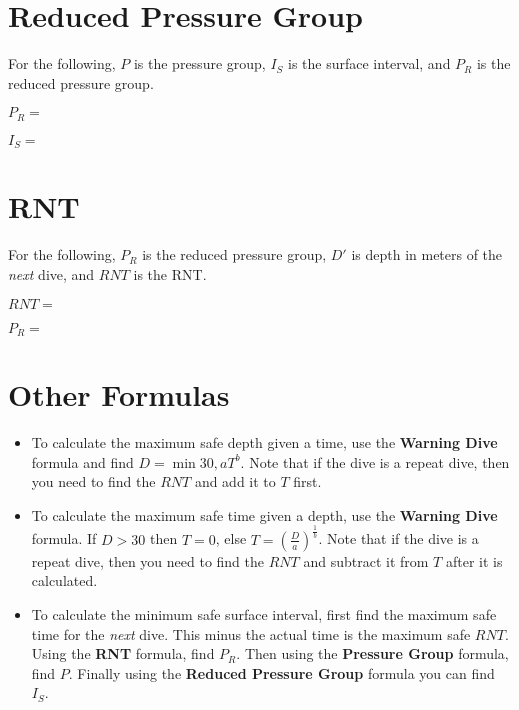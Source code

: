 \documentclass[17pt]{article}
\begin{document}
\newpage

\section{Reduced Pressure Group}

For the following, $P$ is the pressure group, $I_S$ is the surface interval, and $P_R$ is the reduced pressure group.

$P_R = $

$I_S = $

\newpage

\section{RNT}

For the following, $P_R$ is the reduced pressure group, $D'$ is depth in meters of the \emph{next} dive, and $RNT$ is the RNT.

$RNT = $

$P_R = $

\newpage

\section{Other Formulas}

\begin{itemize}
	\item To calculate the maximum safe depth given a time, use the \textbf{Warning Dive} formula and find $D = \min 30, aT^b$. Note that if the dive is a repeat dive, then you need to find the $RNT$ and add it to $T$ first.
	\item To calculate the maximum safe time given a depth, use the \textbf{Warning Dive} formula. If $D > 30$ then $T = 0$, else $T = \left(\frac{D}{a}\right)^{\frac{1}{b}}$. Note that if the dive is a repeat dive, then you need to find the $RNT$ and subtract it from $T$ after it is calculated.
	\item To calculate the minimum safe surface interval, first find the maximum safe time for the \emph{next} dive. This minus the actual time is the maximum safe $RNT$. Using the \textbf{RNT} formula, find $P_R$. Then using the \textbf{Pressure Group} formula, find $P$. Finally using the \textbf{Reduced Pressure Group} formula you can find $I_S$.
\end{itemize}
\end{document}
